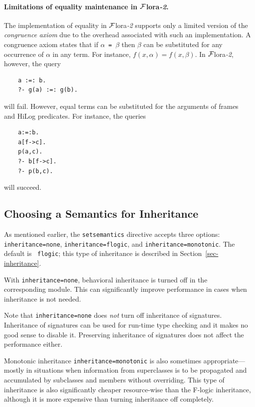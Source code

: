 \documentclass[11pt]{article}
\newcommand{\FLORA}{{\mbox{\sc ${\cal F}${lora}\rm\emph{-2}}}\xspace}
\newcommand{\FLSYSTEM}{\FLORA}
\newcommand{\fl}{\mbox{F-logic}\xspace}
\begin{document}
\paragraph{Limitations of equality maintenance in \FLSYSTEM.}
The implementation of equality in \FLSYSTEM supports only a limited
version of the
\emph{congruence axiom} due to the overhead associated with such an
implementation. A congruence axiom states that if {\tt $\alpha$ = $\beta$}
then {\tt $\beta$} can be substituted for any occurrence of $\alpha$ in any
term. For instance, $f(x,\alpha) = f(x,\beta)$. In \FLSYSTEM, however, the query
\begin{verbatim}
    a :=: b.
    ?- g(a) :=: g(b).
\end{verbatim}
will fail. However,
equal terms can be substituted for the arguments of
frames and HiLog predicates. For instance, the queries
\begin{verbatim}
    a:=:b.
    a[f->c].
    p(a,c).
    ?- b[f->c].  
    ?- p(b,c).
\end{verbatim}
will succeed.


\subsection{Choosing a Semantics for Inheritance}\label{sec-inheritance-directive}

As mentioned earlier, the {\tt setsemantics} directive accepts three options:
{\tt inheritance=none}, {\tt inheritance=flogic}, and
\texttt{inheritance=monotonic}.  The default is {\tt
  flogic}; this type of inheritance is described in
Section~\ref{sec-inheritance}.

With {\tt inheritance=none}, behavioral inheritance is turned off in the
corresponding module.  This can significantly improve performance in cases
when inheritance is not needed.

Note that {\tt inheritance=none} does \emph{not} turn off inheritance of
signatures. Inheritance of signatures can be used for run-time type checking
and it makes no good sense to disable it. Preserving inheritance of
signatures does not affect the performance either.

Monotonic inheritance \texttt{inheritance=monotonic} is also sometimes
appropriate---mostly in situations when information from superclasses is to
be propagated and accumulated by subclasses and members without overriding.
This type of inheritance is also significantly cheaper resource-wise than
the \fl inheritance, although it is more expensive than turning inheritance
off completely.
\end{document}
